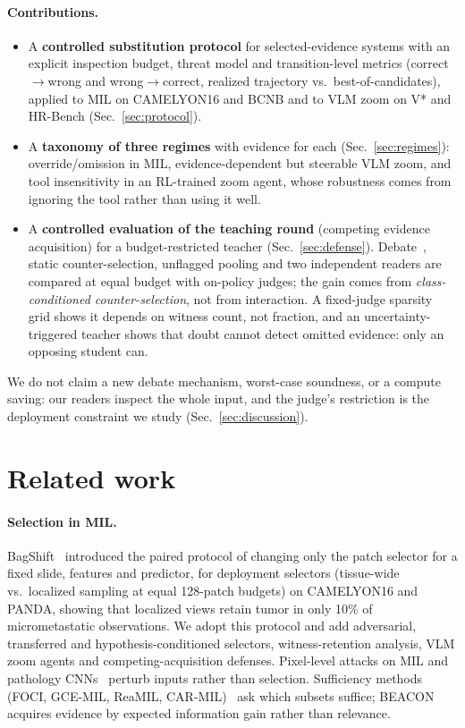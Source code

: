 \documentclass[10pt,twocolumn,letterpaper]{article}
\begin{document}
\paragraph{Contributions.}
\begin{itemize}
\item A \textbf{controlled substitution protocol} for selected-evidence systems with an explicit inspection budget, threat model and transition-level metrics (correct$\to$wrong and wrong$\to$correct, realized trajectory vs.\ best-of-candidates), applied to MIL on CAMELYON16 and BCNB and to VLM zoom on V* and HR-Bench (Sec.~\ref{sec:protocol}).
\item A \textbf{taxonomy of three regimes} with evidence for each (Sec.~\ref{sec:regimes}): override/omission in MIL, evidence-dependent but steerable VLM zoom, and tool insensitivity in an RL-trained zoom agent, whose robustness comes from ignoring the tool rather than using it well.
\item A \textbf{controlled evaluation of the teaching round} (competing evidence acquisition) for a budget-restricted teacher (Sec.~\ref{sec:defense}). Debate~\cite{irving2018debate}, static counter-selection, unflagged pooling and two independent readers are compared at equal budget with on-policy judges; the gain comes from \emph{class-conditioned counter-selection}, not from interaction. A fixed-judge sparsity grid shows it depends on witness count, not fraction, and an uncertainty-triggered teacher shows that doubt cannot detect omitted evidence: only an opposing student can.
\end{itemize}
We do not claim a new debate mechanism, worst-case soundness, or a compute saving: our readers inspect the whole input, and the judge's restriction is the deployment constraint we study (Sec.~\ref{sec:discussion}).

\section{Related work}\label{sec:related}
\paragraph{Selection in MIL.} BagShift~\cite{bagshift2026} introduced the paired protocol of changing only the patch selector for a fixed slide, features and predictor, for deployment selectors (tissue-wide vs.\ localized sampling at equal 128-patch budgets) on CAMELYON16 and PANDA, showing that localized views retain tumor in only 10\% of micrometastatic observations. We adopt this protocol and add adversarial, transferred and hypothesis-conditioned selectors, witness-retention analysis, VLM zoom agents and competing-acquisition defenses. Pixel-level attacks on MIL and pathology CNNs~\cite{mil_adv2022,foote2021now} perturb inputs rather than selection. Sufficiency methods (FOCI, GCE-MIL, ReaMIL, CAR-MIL)~\cite{foci2026,gcemil2026,reamil2026,carmil2026} ask which subsets suffice; BEACON~\cite{beacon2026} acquires evidence by expected information gain rather than relevance.
\end{document}
